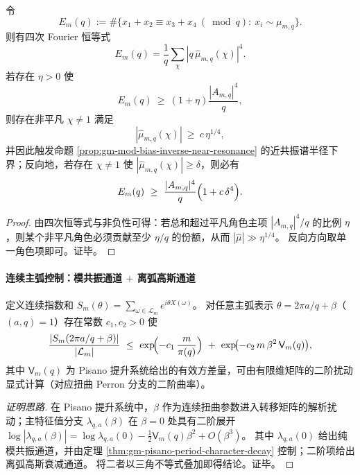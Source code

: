 \begin{proposition}\label{prop:gm-mod-additive-energy-inverse}
令
\[
E_m(q):=\#\{x_1+x_2\equiv x_3+x_4\ (\bmod q):\ x_i\sim\mu_{m,q}\}.
\]
则有四次 Fourier 恒等式
\[
E_m(q)=\frac{1}{q}\sum_{\chi}|q\,\widehat\mu_{m,q}(\chi)|^4.
\]
若存在 \(\eta>0\) 使
\[
E_m(q)\ \ge\ (1+\eta)\frac{|A_{m,q}|^4}{q},
\]
则存在非平凡 \(\chi\neq 1\) 满足
\[
|\widehat\mu_{m,q}(\chi)|\ \ge\ c\,\eta^{1/4},
\]
并因此触发命题 \ref{prop:gm-mod-bias-inverse-near-resonance} 的近共振谱半径下界；反向地，若存在 \(\chi\neq 1\) 使 \(|\widehat\mu_{m,q}(\chi)|\ge \delta\)，则必有
\[
E_m(q)\ \ge\ \frac{|A_{m,q}|^4}{q}\Bigl(1+c\,\delta^4\Bigr).
\]
\end{proposition}

\begin{proof}
由四次恒等式与非负性可得：若总和超过平凡角色主项 \(|A_{m,q}|^4/q\) 的比例 \(\eta\)，则某个非平凡角色必须贡献至少 \(\eta/q\) 的份额，从而 \(|\widehat\mu|\gg \eta^{1/4}\)。
反向方向取单一角色项即可。证毕。
\end{proof}

\paragraph{连续主弧控制：模共振通道 \texorpdfstring{$+$}{+} 离弧高斯通道}
\begin{proposition}\label{prop:gm-continuous-major-arc-control}
定义连续指数和 \(S_m(\theta)=\sum_{\omega\in\mathcal{L}_m}e^{i\theta X(\omega)}\)。
对任意主弧表示 \(\theta=2\pi a/q+\beta\)（\((a,q)=1\)）存在常数 \(c_1,c_2>0\) 使
\[
\frac{|S_m(2\pi a/q+\beta)|}{|\mathcal{L}_m|}
\ \le\
\exp\!\Bigl(-c_1\,\frac{m}{\pi(q)}\Bigr)
\ +\
\exp\!\bigl(-c_2\,m\,\beta^2\,\mathsf{V}_m(q)\bigr),
\]
其中 \(\mathsf{V}_m(q)\) 为 Pisano 提升系统给出的有效方差量，可由有限维矩阵的二阶扰动显式计算（对应扭曲 Perron 分支的二阶曲率）。
\end{proposition}

\begin{proof}[证明思路]
在 Pisano 提升系统中，\(\beta\) 作为连续扭曲参数进入转移矩阵的解析扰动；主特征值分支 \(\lambda_{q,a}(\beta)\) 在 \(\beta=0\) 处具有二阶展开
\(
\log|\lambda_{q,a}(\beta)|=\log\lambda_{q,a}(0)-\tfrac12\mathsf{V}_m(q)\beta^2+O(\beta^3)
\)。
其中 \(\lambda_{q,a}(0)\) 给出纯模共振通道，并由定理 \ref{thm:gm-pisano-period-character-decay} 控制；二阶项给出离弧高斯衰减通道。
将二者以三角不等式叠加即得结论。证毕。
\end{proof}

